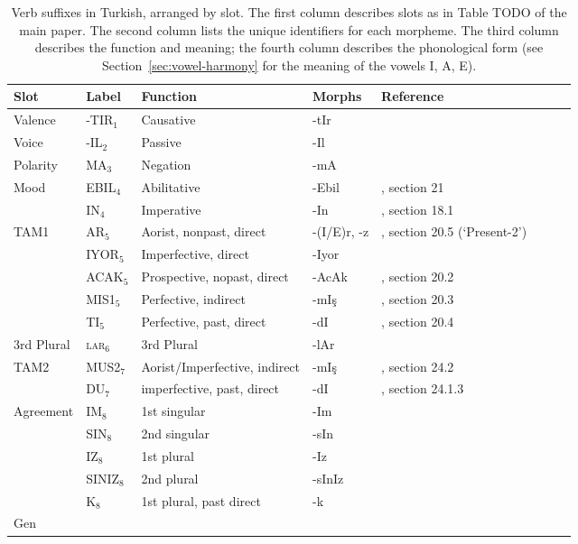 \documentclass[11pt,letterpaper]{article}
\begin{document}
\begin{table}
\begin{tabular}{llllllll}
Slot & Label & Function & Morphs & Reference \\ \hline
\hline
	Valence & -TIR$_1$  & Causative & -tIr & \\
\hline
	Voice &  -IL$_2$ & Passive & -Il\\
\hline
Polarity  & MA$_3$ & Negation & -mA \\
\hline
Mood  & EBIL$_4$ & Abilitative & -Ebil & \cite{schaaik2020turkish}, section 21 \\
      & IN$_4$   & Imperative & -In & \cite{schaaik2020turkish}, section 18.1 \\
\hline
TAM1      & AR$_5$ & Aorist, nonpast, direct & -(I/E)r, -z  & \cite{schaaik2020turkish}, section 20.5 (`Present-2') \\
          & IYOR$_5$ & Imperfective, direct & -Iyor \\
          & ACAK$_5$ & Prospective, nopast, direct & -AcAk & \cite{schaaik2020turkish}, section 20.2\\
          & MIS1$_5$  & Perfective, indirect & -mIş & \cite{schaaik2020turkish}, section 20.3\\
          & TI$_5$ & Perfective, past, direct & -dI & \cite{schaaik2020turkish}, section 20.4\\
\hline
	3rd Plural& \textsc{lar}$_{6}$  & 3rd Plural & -lAr & \\
\hline
TAM2      & MUS2$_7$ & Aorist/Imperfective, indirect & -mIş & \cite{schaaik2020turkish}, section 24.2 \\
          & DU$_7$ & imperfective, past, direct & -dI & \cite{schaaik2020turkish}, section 24.1.3 \\
\hline
	Agreement & IM$_8$ & 1st singular & -Im\\
	  & SIN$_8$ &2nd singular & -sIn\\
	  & IZ$_8$  & 1st plural & -Iz\\
	  & SINIZ$_8$ & 2nd plural & -sInIz \\
	  & K$_8$     & 1st plural, past direct & -k\\
\hline
Gen & \\
\hline
\end{tabular}
	\caption{Verb suffixes in Turkish, arranged by slot. The first column describes slots as in Table TODO of the main paper. The second column lists the unique identifiers for each morpheme. The third column describes the function and meaning; the fourth column describes the phonological form (see Section~\ref{sec:vowel-harmony} for the meaning of the vowels I, A, E).}\label{tab:turkish-suffixes}
\end{table}
\end{document}
